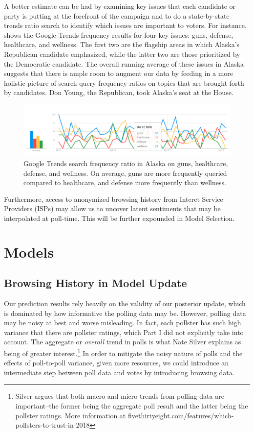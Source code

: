 \documentclass[12pt, letterpaper]{article}
\begin{document}
A better estimate can be had by examining key issues that each candidate or party is putting at the forefront of the campaign and to do a state-by-state trends ratio search to identify which issues are important to voters. For instance,  shows the Google Trends frequency results for four key issues: guns, defense, healthcare, and wellness. The first two are the flagship areas in which Alaska's Republican candidate emphasized, while the latter two are those prioritized by the Democratic candidate. The overall running average of these issues in Alaska suggests that there is ample room to augment our data by feeding in a more holistic picture of search query frequency ratios on topics that are brought forth by candidates. Don Young, the Republican, took Alaska's seat at the House.

\begin{figure}[tbh]
  \centering
  \includegraphics[scale=0.4]{trends_issues}
  \caption{Google Trends search frequency ratio in Alaska on guns, healthcare, defense, and wellness. On average, guns are more frequently queried compared to healthcare, and defense more frequently than wellness.}
  \label{fig:trends_issues}
\end{figure}

Furthermore, access to anonymized browsing history from Interet Service Providers (ISPs) may allow us to uncover latent sentiments that may be interpolated at poll-time. This will be further expounded in Model Selection. 

\section{Models}
\subsection{Browsing History in Model Update}
Our prediction results rely heavily on the validity of our posterior update, which is dominated by how informative the polling data may be. However, polling data may be noisy at best and worse misleading. In fact, each pollster has such high variance that there are pollster ratings, which Part I did not explicitly take into account. The aggregate or \textit{overall} trend in polls is what Nate Silver explains as being of greater interest.\footnote{Silver argues that both macro and micro trends from polling data are important--the former being the aggregate poll result and the latter being the pollster ratings. More information at fivethirtyeight.com/features/which-pollsters-to-trust-in-2018} In order to mitigate the noisy nature of polls and the effects of poll-to-poll variance, given more resources, we could introduce an intermediate step between poll data and votes by introducing browsing data.
\end{document}
